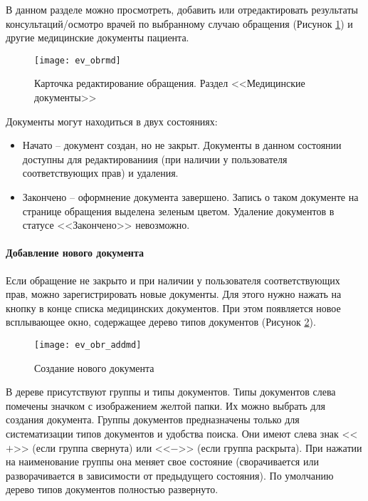 В данном разделе можно просмотреть, добавить или отредактировать результаты консультаций\slash осмотро врачей по выбранному случаю обращения (Рисунок \ref{img_ev_obrmd}) и другие медицинские документы пациента.

\begin{figure}[ht]\centering
 \texttt{[image: ev\_obrmd]}
 \caption{Карточка редактирование обращения. Раздел <<Медицинские документы>>}
 \label{img_ev_obrmd}
\end{figure}

Документы могут находиться в двух состояниях:
\begin{itemize}
 \item Начато -- документ создан, но не закрыт. Документы в данном состоянии доступны для редактированиия (при наличии у пользователя соответствующих прав) и удаления. 
 \item Закончено -- оформнение документа завершено. Запись о таком документе на странице обращения выделена зеленым цветом. Удаление документов в статусе <<Закончено>> невозможно.
\end{itemize}

\paragraph{Добавление нового документа} \label{pol_obr_mdnew}

Если обращение не закрыто и при наличии у пользователя соответствующих прав, можно зарегистрировать новые документы. Для этого нужно нажать на кнопку  в конце списка медицинских документов. При этом появляется новое всплывающее окно, содержащее дерево типов документов (Рисунок \ref{img_ev_obr_addmd}).

\begin{figure}[ht]\centering
 \texttt{[image: ev\_obr\_addmd]}
 \caption{Создание нового документа}
 \label{img_ev_obr_addmd}
\end{figure}

В дереве присутствуют группы и типы документов. Типы документов слева помечены значком с изображением желтой папки. Их можно выбрать для создания документа. Группы документов предназначены только для систематизации типов документов и удобства поиска. Они имеют слева знак <<$+$>> (если группа свернута) или <<$-$>> (если группа раскрыта). При нажатии на наименование группы она меняет свое состояние (сворачивается или разворачивается в зависимости от предыдущего состояния). По умолчанию дерево типов документов полностью развернуто. 

